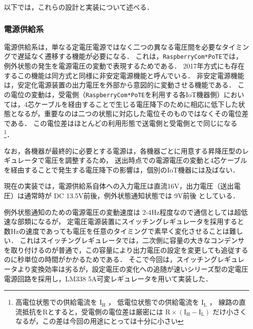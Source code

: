 以下では，これらの設計と実装について述べる．


\subsubsection{電源供給系}


電源供給系は，単なる定電圧電源ではなく二つの異なる電圧間を必要なタイミングで遅延なく遷移する機能が必要になる．
これは，{\tt Raspberry\-Com*PoTE}では，例外状態の発生を電源電圧の変動で表現するためである．
2017年方式にも存在するこの機能は同方式と同様に非安定電源機能と呼んでいる．
非安定電源機能は，安定化電源装置の出力電圧を外部から意図的に変動させる機能である．
この電位の変動は，受電側（{\tt Raspberry\-Com*PoTE}を利用する各IoT機器側）においては，4芯ケーブルを経由することで生じる電圧降下のために相応に低下した状態となるが，重要なのは二つの状態に対応した電位そのものではなくその電位差である．
この電位差はほとんどの利用形態で送電側と受電側とで同じになる
\footnote{高電位状態での供給電流を $\text{I}_\text{H}$ ，
  低電位状態での供給電流を $\text{I}_\text{L}$ ，
  線路の直流抵抗をRとすると，受電側の電位差は厳密には
  $ \text{R} \times (\text{I}_\text{H} - \text{I}_\text{L}) $
  だけ小さくなるが，この差は今回の用途にとっては十分に小さい}．

なお，各機器が最終的に必要とする電源は，各機器ごとに用意する昇降圧型のレギュレータで電圧を調整するため，
送出時点での電源電圧の変動と4芯ケーブルを経由することで発生する電圧降下の影響は，個別のIoT機器には及ばない．

現在の実装では，電源供給系自体への入力電圧は直流16V，出力電圧（送出電圧）は通常時が DC 13.5V前後，例外状態通知状態では 9V前後 としている．

例外状態通知のための電源電圧の変動速度は 2-4Hz程度なので通信としては超低速な部類になるが，
定電圧電源装置にスイッチングレギュレータを採用すると数Hzの速度であっても電圧を任意のタイミングで素早く変化させることは難しい．
これはスイッチングレギュレータでは，二次側に容量の大きなコンデンサを取り付けるのが普通で，この容量により出力電圧の設定を変更しても追従するのに秒単位の時間がかかるためである．
そこで今回は，スイッチングレギュレータより変換効率は劣るが，設定電圧の変化への追随が速いシリーズ型の定電圧電源回路を採用し，LM338 5A可変レギュレータ\cite{data:LM338}を用いて実装した．


